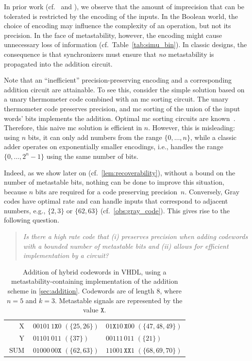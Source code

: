 \documentclass[9pt,journal,compsoc]{IEEEtran}
\theoremstyle{remark}
\newcommand{\mfx}{\mathtt{X}}
\begin{document}
In prior work (cf.~\cite{bund20optimal} and \cite{bund2025small}), we observe that the amount of imprecision that can be tolerated is restricted by the
  encoding of the inputs.
In the Boolean world, the choice of encoding may influence the complexity
  of an operation, but not its precision.
In the face of metastability, however, the encoding might cause unnecessary loss of
  information (cf.\ Table~\ref{tab:simu_bin}).
In classic designs, the consequence is that synchronizers must ensure that \emph{no} metastability is propagated into the addition circuit.

Note that an ``inefficient'' precision-preserving encoding and a corresponding addition circuit are attainable.  
To see this, consider the simple solution based on a unary thermometer code combined with an mc sorting circuit.
The unary thermometer code preserves precision, and mc sorting of the union of the input words' bits implements the addition. 
Optimal mc sorting circuits are known~\cite{bund20optimal}.
Therefore, this naive mc solution is efficient in $n$. 
However, this is misleading: using $n$ bits, it can only add numbers from the range $\{0,\ldots,n\}$, while a classic adder operates on exponentially smaller encodings, i.e., handles the range $\{0,\ldots,2^n-1\}$ using the same number of bits.

Indeed, as we show later on (cf.~\cref{lem:recoverability}), without a bound on the 
  number of metastable bits, nothing can be done to improve this situation, because $n$ bits are required for a code preserving precision~$n$. 
Conversely, Gray codes have optimal rate and can handle inputs that correspond to adjacent numbers, e.g., $\{2,3\}$ or $\{62,63\}$ (cf.~\cref{obs:gray_code}). 
This gives rise to the following question. 
\begin{quote}
    \emph{Is there a high rate code that (i) preserves precision when adding codewords with a bounded number of metastable bits and (ii) allows for efficient implementation by a circuit?}
\end{quote}

\begin{table}
  \caption{Addition of hybrid codewords in VHDL, using a metastability-containing implementation of the addition scheme in 
           \cref{sec:addition}. Codewords are of length $8$, where $n=5$ and $k=3$. Metastable signals are represented by the value $\mfx$.}
  \label{tab:simu_mc}
  \centering
  \begin{tabular}{rll}
    $\operatorname{X}$ & $00101\,1\mfx0$ $(\{25,26\})$ & $01\mfx10\,\mfx00$ $(\{47,48,49\})$ \\
    $\operatorname{Y}$ & $01101\,011$ $(\{37\})$ & $00111\,011$ $(\{21\})$ \\ \hline
    $\operatorname{SUM}$ & $01000\,00\mfx$ $(\{62,63\})$ & $11001\,\mfx\mfx1$ $(\{68,69,70\})$ 
  \end{tabular}
\end{table}
\end{document}
